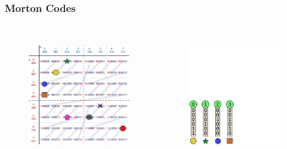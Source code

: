 \documentclass{beamer}
\begin{document}
\begin{frame}
  \frametitle{Morton Codes}
  
\begin{columns}[t]

\begin{figure}
\includegraphics[height=55mm]{Z-curve-primitives.png}
\end{figure}

\begin{figure}
\includegraphics[height=55mm]{keys_3.png}
\end{figure}
\end{columns}
\end{frame}
\end{document}

